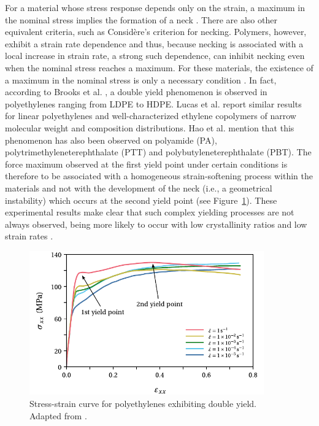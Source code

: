 For a material whose stress response depends only on the strain, a maximum in the nominal stress implies the formation of a neck \citep{wardIntroductionMechanicalProperties2004}.
There are also other equivalent criteria, such as Considère's criterion for necking.
Polymers, however, exhibit a strain rate dependence and thus, because necking is associated with a local increase in strain rate, a strong such dependence, can inhibit necking even when the nominal stress reaches a maximum.
For these materials, the existence of a maximum in the nominal stress is only a necessary condition \citep{wardIntroductionMechanicalProperties2004}.
In fact, according to Brooks et al. \citep{brooksModelingDoubleYield1995}, a double yield phenomenon is observed in polyethylenes ranging from LDPE to HDPE.
Lucas et al. \cite{lucasDoubleYieldTensile1995} report similar results for linear polyethylenes and well-characterized ethylene copolymers of narrow molecular weight and composition distributions.
Hao et al. \citep{haoRatedependentConstitutiveModel2022} mention that this phenomenon has also been observed on polyamide (PA), polytrimethyleneterephthalate (PTT) and polybutyleneterephthalate (PBT).
The force maximum observed at the first yield point under certain conditions is therefore to be associated with a homogeneous strain-softening process within the materials and not with the development of the neck (i.e., a geometrical instability) which occurs at the second yield point (see Figure~\ref{fig:double_yield}).
These experimental results make clear that such complex yielding processes are not always observed, being more likely to occur with low crystallinity ratios and low strain rates \citep{zengConstitutiveModelSemicrystalline2010}.
\begin{figure}[htbp]
	\centering
	\includegraphics[width=0.9\textwidth]{figures/double_yield}
	\caption{Stress-strain curve for polyethylenes exhibiting double yield. Adapted from \cite{khanThermomechanicalResponseNylon2006}.}
\label{fig:double_yield}
\end{figure}

